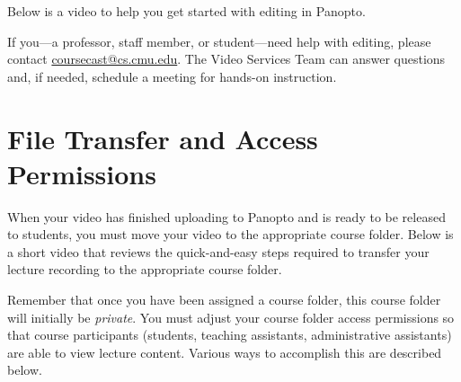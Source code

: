 \begin{gram}[Tutorial]
	Below is a video to help you get started with editing in Panopto.


\end{gram}

\begin{note}
If you---a professor, staff member, or student---need help with
editing, please contact
\href{mailto:coursecast@cs.cmu.edu}{coursecast@cs.cmu.edu}. The Video
Services Team can answer questions and, if needed, schedule a meeting
for hands-on instruction.
\end{note}

\section{File Transfer and Access Permissions}
\label{sec:panopto:file_transfer_and_access_permissions}

\begin{gram}
	When your video has finished uploading to Panopto and is ready to be released to students, you must move your video to the appropriate course folder. Below is a short video that reviews the quick-and-easy steps required to transfer your lecture recording to the appropriate course folder.

\end{gram}

\begin{important}
	Remember that once you have been assigned a course folder, this course folder will initially be \emph{private}. You must adjust your course folder access permissions so that course participants (students, teaching assistants, administrative assistants) are able to view lecture content. Various ways to accomplish this are described below.
\end{important}

